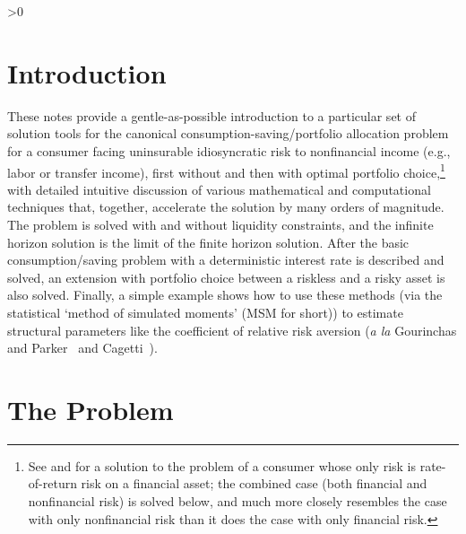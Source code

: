 \documentclass[titlepage, headings=optiontotocandhead]{econark}
\begin{document}
\titlepagefinish

\thispagestyle{empty} %
\newpage{} %



\ifnum\pdfoutput>0
  \tableofcontents {}\newpage
\fi
\newpage{} %

\thispagestyle{empty} %
\hypertarget{introduction}{}
\section{Introduction}\label{sec:introduction}

  These notes provide a gentle-as-possible introduction to a particular set of solution tools for the canonical consumption-saving/portfolio allocation problem for a consumer facing uninsurable idiosyncratic risk to nonfinancial income (e.g., labor or transfer income), first without and then with optimal portfolio choice,\footnote{See \cite{merton:restat} and \cite{samuelson:portfolio} for a solution to the problem of a consumer whose only risk is rate-of-return risk on a financial asset; the combined case (both financial and nonfinancial risk) is solved below, and much more closely resembles the case with only nonfinancial risk than it does the case with only financial risk.} with detailed intuitive discussion of various mathematical and computational techniques that, together, accelerate the solution by many orders of magnitude.  The problem is solved with and without liquidity constraints, and the infinite horizon solution is the limit of the finite horizon solution.  After the basic consumption/saving problem with a deterministic interest rate is described and solved, an extension with portfolio choice between a riskless and a risky asset is also solved.  Finally, a simple example shows how to use these methods (via the statistical `method of simulated moments' (MSM for short)) to estimate structural parameters like the coefficient of relative risk aversion (\textit{a la} Gourinchas and Parker~\citeyearpar{gpLifecycle} and Cagetti~\citeyearpar{cagettiWprofiles}).


\hypertarget{the-problem}{}
\section{The Problem}\label{sec:the-problem}
\end{document}
